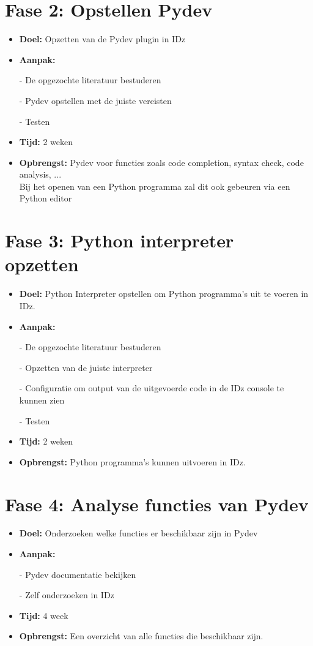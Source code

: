 \section{Fase 2: Opstellen Pydev}
\label{sec:m-opstellen-pydev}
\begin{itemize}
    \item \textbf{Doel:}
    Opzetten van de Pydev plugin in IDz
    \item \textbf{Aanpak:}
    \item[-] De opgezochte literatuur bestuderen
    \item[-] Pydev opstellen met de juiste vereisten
    \item[-] Testen
    \item \textbf{Tijd:} 2 weken
    \item \textbf{Opbrengst:}
    Pydev voor functies zoals code completion, syntax check, code analysis, ... \\ 
    Bij het openen van een Python programma zal dit ook gebeuren via een Python editor
\end{itemize}


\section{Fase 3: Python interpreter opzetten}
\label{sec:m-python-interpreter-opzetten}
\begin{itemize}
    \item \textbf{Doel:}
    Python Interpreter opstellen om Python programma's uit te voeren in IDz.
    \item \textbf{Aanpak:}
    \item[-] De opgezochte literatuur bestuderen
    \item[-] Opzetten van de juiste interpreter
    \item[-] Configuratie om output van de uitgevoerde code in de IDz console te kunnen zien
    \item[-] Testen
    
    \item \textbf{Tijd:} 2 weken
    \item \textbf{Opbrengst:}
    Python programma's kunnen uitvoeren in IDz.
\end{itemize}


\section{Fase 4: Analyse functies van Pydev}
\label{sec:m-verdere-configuratie}
\begin{itemize}
    \item \textbf{Doel:}
    Onderzoeken welke functies er beschikbaar zijn in Pydev
    \item \textbf{Aanpak:}
    \item[-] Pydev documentatie bekijken
    \item[-] Zelf onderzoeken in IDz
    
    \item \textbf{Tijd:} 4 week
    \item \textbf{Opbrengst:}
    Een overzicht van alle functies die beschikbaar zijn. 
\end{itemize}

